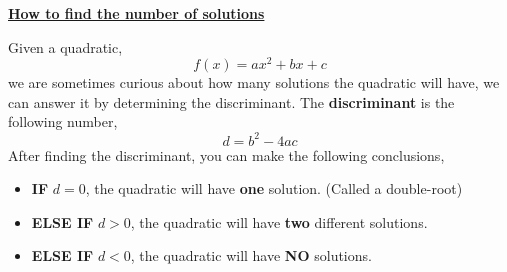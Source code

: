 \documentclass[12pt]{article} %
\begin{document}
	\renewcommand*{\coursecode}{MATH 235} %
	\renewcommand*{\assgnnumber}{Assignment 1} %
	\renewcommand*{\submdate}{September 14, 2021} %
	\renewcommand*{\studentfname}{Abdullah} %
	\renewcommand*{\studentlname}{Zubair} %
    \renewcommand*{\proofname}{Proof:}

	\renewcommand\qedsymbol{$\blacksquare$}
	\setfigpath
	\fancyhfoffset[L,O]{0pt} %




\begin{center}
		\Huge{\underline{\textbf{How to find the number of solutions}}}
\end{center}
Given a quadratic,
\[
      f(x) = ax^2 + bx + c
\] we are sometimes curious about how many solutions the quadratic will have, we can answer it by determining the discriminant.
The \textbf{discriminant} is the following number,
\[
      d = b^2 - 4ac
\]After finding the discriminant, you can make the following conclusions,
\begin{itemize}
  \item \textbf{IF} $d = 0$, the quadratic will have \textbf{one} solution. (Called a double-root)
  \item \textbf{ELSE IF} $d > 0$, the quadratic will have \textbf{two} different solutions.
  \item \textbf{ELSE IF} $d < 0$, the quadratic will have \textbf{NO} solutions. 
\end{itemize}
\end{document}
